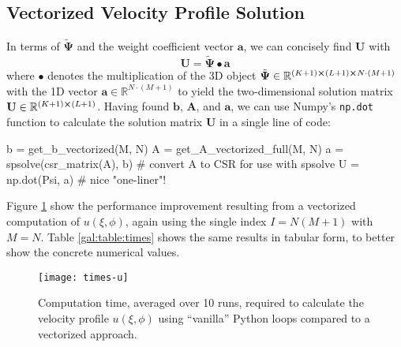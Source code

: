 \documentclass[11pt, a4paper]{article}
\newcommand{\mat}[1]{\mathbf{#1}}
\renewcommand{\t}[1]{\tilde{#1}}
\renewcommand{\vec}[1]{\bm{#1}}
\begin{document}
\subsection{Vectorized Velocity Profile Solution}
In terms of $ \t{\bm{\Psi}}  $ and the weight coefficient vector $ \vec{a} $, we can concisely find $ \mat{U} $ with
\begin{equation*}
	\mat{U} =  \t{\bm{\Psi}} \bullet \bm{a}
\end{equation*}
where $ \bullet $ denotes the multiplication of the 3D object $ \t{\bm{\Psi}} \in \mathbb{R}^{(K+1)\cross(L+1)\cross N\cdot(M+1)} $ with the 1D vector $ \vec{a} \in \mathbb{R}^{N\cdot(M+1)} $ to yield the two-dimensional solution matrix $ \mat{U} \in \mathbb{R}^{(K+1) \cross (L+1)} $. Having found $ \vec{b} $, $ \mat{A} $, and $ \vec{a} $, we can use Numpy's \texttt{np.dot} function to calculate the solution matrix $ \mat{U} $ in a single line of code:
\begin{python}
b = get_b_vectorized(M, N)
A = get_A_vectorized_full(M, N)
a = spsolve(csr_matrix(A), b)   # convert A to CSR for use with spsolve
U = np.dot(Psi, a)              # nice "one-liner"!
\end{python}
Figure \ref{gal:fig:times-u} show the performance improvement resulting from a vectorized computation of $ u(\xi, \phi) $, again using the single index $ I = N(M+1) $ with $ M = N $. Table \ref{gal:table:times} shows the same results in tabular form, to better show the concrete numerical values. 

\begin{figure}[htb!]
\centering
\texttt{[image: times-u]}
\vspace{-2mm}
\caption{Computation time, averaged over 10 runs, required to calculate the velocity profile $ u(\xi, \phi) $ using ``vanilla'' Python loops compared to a vectorized approach.}
\label{gal:fig:times-u}
\end{figure}
\end{document}
